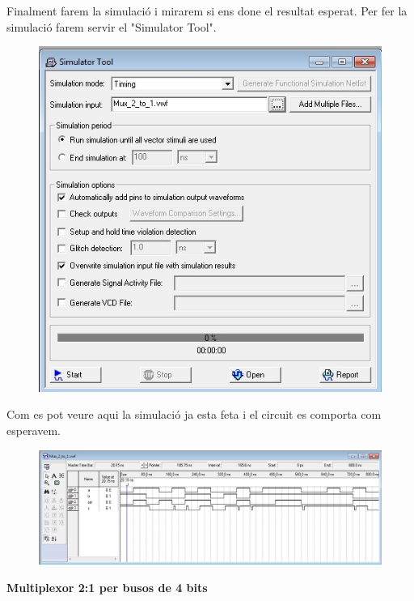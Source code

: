 \documentclass[12pt, a4papre]{article}
\begin{document}
	Finalment farem la simulació i mirarem si ens done el resultat esperat. Per fer la simulació farem servir el "Simulator Tool".
	\begin{figure}[H]
		\begin{center}
		\includegraphics[width=150mm]{finestrasimulacio.jpeg}
		\end{center}
	\end{figure}
	
	Com es pot veure aqui la simulació ja esta feta i el circuit es comporta com esperavem.
	\begin{figure}[H]
		\begin{center}
		\includegraphics[width=150mm]{simulaciofeta.jpeg}
		\end{center}
	\end{figure}
	
	\textbf{\large{Multiplexor 2:1 per busos de 4 bits}}
	
\end{document}
